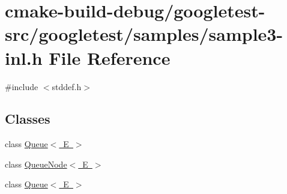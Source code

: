 \hypertarget{sample3-inl_8h}{}\section{cmake-\/build-\/debug/googletest-\/src/googletest/samples/sample3-\/inl.h File Reference}
\label{sample3-inl_8h}
{\ttfamily \#include $<$stddef.\+h$>$}\newline
\subsection*{Classes}
\begin{DoxyCompactItemize}
\item 
class \mbox{\hyperlink{classQueue}{Queue$<$ E $>$}}
\item 
class \mbox{\hyperlink{classQueueNode}{Queue\+Node$<$ E $>$}}
\item 
class \mbox{\hyperlink{classQueue}{Queue$<$ E $>$}}
\end{DoxyCompactItemize}
